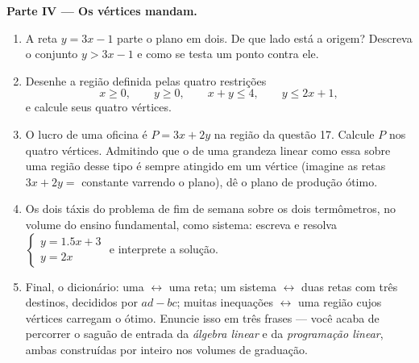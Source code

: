 \begin{problem}
\medskip
\noindent\textbf{Parte IV --- Os vértices mandam.}
\begin{enumerate}[resume]
  \item A reta $y = 3x - 1$ parte o plano em dois. De que lado
        está a origem? Descreva o conjunto $y > 3x - 1$ e como se
        testa um ponto contra ele.
  \item Desenhe a região definida pelas quatro restrições
        \[
        x \geq 0, \qquad y \geq 0, \qquad x + y \leq 4,
        \qquad y \leq 2x + 1,
        \]
        e calcule seus quatro vértices.
  \item O lucro de uma oficina é $P = 3x + 2y$ na região da
        questão 17. Calcule $P$ nos quatro vértices. Admitindo
        que o  de uma grandeza linear como essa sobre uma
        região desse tipo é sempre atingido em um vértice
        (imagine as retas $3x + 2y = $ constante varrendo o
        plano), dê o plano de produção ótimo.
  \item Os dois táxis do problema de fim de semana sobre os dois
        termômetros, no volume do ensino fundamental, como
        sistema: escreva e resolva
        $\begin{cases} y = 1.5x + 3 \\ y = 2x \end{cases}$ e
        interprete a solução.
  \item Final, o dicionário: uma  $\leftrightarrow$ uma
        reta; um sistema $\leftrightarrow$ duas retas com três
        destinos, decididos por $ad - bc$; muitas inequações
        $\leftrightarrow$ uma região cujos vértices carregam o
        ótimo. Enuncie isso em três frases --- você acaba de
        percorrer o saguão de entrada da \emph{álgebra linear} e
        da \emph{programação linear}, ambas construídas por
        inteiro nos volumes de graduação.
\end{enumerate}
\end{problem}
